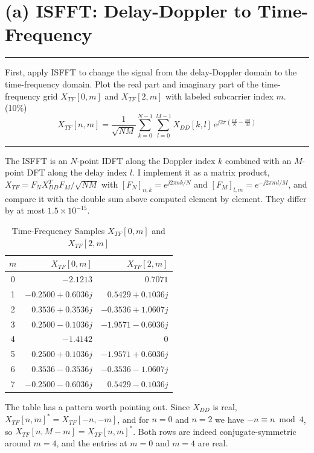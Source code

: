 \documentclass[12pt,a4paper]{report}
\newcommand{\question}[1]{%
    \hrule
    \vspace{0.2cm}
    #1
    \vspace{0.2cm}
    \hrule
    \vspace{0.5cm}
}
\begin{document}
\newpage

\section{(a) ISFFT: Delay-Doppler to Time-Frequency}

\question{First, apply ISFFT to change the signal from the delay-Doppler domain to the time-frequency domain.
Plot the real part and imaginary part of the time-frequency grid $X_{TF}[0, m]$ and $X_{TF}[2, m]$ with labeled
subcarrier index $m$. (10\%)
\[ X_{TF}[n, m] = \frac{1}{\sqrt{NM}} \sum_{k=0}^{N-1} \sum_{l=0}^{M-1} X_{DD}[k, l]\, e^{j2\pi\left(\frac{nk}{N} - \frac{ml}{M}\right)} \]}

The ISFFT is an $N$-point IDFT along the Doppler index $k$ combined with an $M$-point DFT along the delay
index $l$. I implement it as a matrix product, $X_{TF} = F_N X_{DD}^{T} F_M / \sqrt{NM}$ with
$[F_N]_{n,k} = e^{j2\pi nk/N}$ and $[F_M]_{l,m} = e^{-j2\pi ml/M}$, and compare it with the double sum above
computed element by element. They differ by at most $1.5 \times 10^{-15}$.

\begin{table}[H]
\centering
\caption{Time-Frequency Samples $X_{TF}[0, m]$ and $X_{TF}[2, m]$}
\setlength{\tabcolsep}{14pt}
\renewcommand{\arraystretch}{1.1}
\begin{tabular}{crr}
\toprule
$m$ & $X_{TF}[0, m]$ & $X_{TF}[2, m]$ \\
\midrule
0 & $-2.1213$            & $0.7071$ \\
1 & $-0.2500 + 0.6036j$  & $0.5429 + 0.1036j$ \\
2 & $0.3536 + 0.3536j$   & $-0.3536 + 1.0607j$ \\
3 & $0.2500 - 0.1036j$   & $-1.9571 - 0.6036j$ \\
4 & $-1.4142$            & $0$ \\
5 & $0.2500 + 0.1036j$   & $-1.9571 + 0.6036j$ \\
6 & $0.3536 - 0.3536j$   & $-0.3536 - 1.0607j$ \\
7 & $-0.2500 - 0.6036j$  & $0.5429 - 0.1036j$ \\
\bottomrule
\end{tabular}
\end{table}

The table has a pattern worth pointing out. Since $X_{DD}$ is real, $X_{TF}[n, m]^{*} = X_{TF}[-n, -m]$,
and for $n = 0$ and $n = 2$ we have $-n \equiv n \bmod 4$, so $X_{TF}[n, M-m] = X_{TF}[n, m]^{*}$.
Both rows are indeed conjugate-symmetric around $m = 4$, and the entries at $m = 0$ and $m = 4$ are real.
\end{document}
